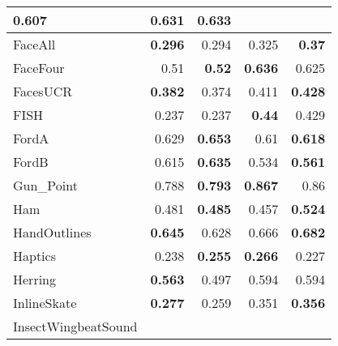\begin{longtable}{|l||r|r||r|r|}
\cellcolor[rgb]{ .973,  .796,  .678} \textbf{0.607} &
0.631 &
\cellcolor[rgb]{ .973,  .796,  .678} \textbf{0.633}
\bigstrut\\
\hline
\rowcolor[rgb]{ .851,  .851,  .851} FaceAll &
\cellcolor[rgb]{ .973,  .796,  .678} \textbf{0.296} &
0.294 &
0.325 &
\cellcolor[rgb]{ .973,  .796,  .678} \textbf{0.37}
\bigstrut\\
\hline
FaceFour &
0.51 &
\cellcolor[rgb]{ .973,  .796,  .678} \textbf{0.52} &
\cellcolor[rgb]{ .973,  .796,  .678} \textbf{0.636} &
0.625
\bigstrut\\
\hline
\rowcolor[rgb]{ .851,  .851,  .851} FacesUCR &
\cellcolor[rgb]{ .973,  .796,  .678} \textbf{0.382} &
0.374 &
0.411 &
\cellcolor[rgb]{ .973,  .796,  .678} \textbf{0.428}
\bigstrut\\
\hline
FISH &
0.237 &
0.237 &
\cellcolor[rgb]{ .973,  .796,  .678} \textbf{0.44} &
0.429
\bigstrut\\
\hline
\rowcolor[rgb]{ .851,  .851,  .851} FordA &
0.629 &
\cellcolor[rgb]{ .973,  .796,  .678} \textbf{0.653} &
0.61 &
\cellcolor[rgb]{ .973,  .796,  .678} \textbf{0.618}
\bigstrut\\
\hline
FordB &
0.615 &
\cellcolor[rgb]{ .973,  .796,  .678} \textbf{0.635} &
0.534 &
\cellcolor[rgb]{ .973,  .796,  .678} \textbf{0.561}
\bigstrut\\
\hline
\rowcolor[rgb]{ .851,  .851,  .851} Gun\_Point &
0.788 &
\cellcolor[rgb]{ .973,  .796,  .678} \textbf{0.793} &
\cellcolor[rgb]{ .973,  .796,  .678} \textbf{0.867} &
0.86
\bigstrut\\
\hline
Ham &
0.481 &
\cellcolor[rgb]{ .973,  .796,  .678} \textbf{0.485} &
0.457 &
\cellcolor[rgb]{ .973,  .796,  .678} \textbf{0.524}
\bigstrut\\
\hline
\rowcolor[rgb]{ .851,  .851,  .851} HandOutlines &
\cellcolor[rgb]{ .973,  .796,  .678} \textbf{0.645} &
0.628 &
0.666 &
\cellcolor[rgb]{ .973,  .796,  .678} \textbf{0.682}
\bigstrut\\
\hline
Haptics &
0.238 &
\cellcolor[rgb]{ .973,  .796,  .678} \textbf{0.255} &
\cellcolor[rgb]{ .973,  .796,  .678} \textbf{0.266} &
0.227
\bigstrut\\
\hline
\rowcolor[rgb]{ .851,  .851,  .851} Herring &
\cellcolor[rgb]{ .973,  .796,  .678} \textbf{0.563} &
0.497 &
0.594 &
0.594
\bigstrut\\
\hline
InlineSkate &
\cellcolor[rgb]{ .973,  .796,  .678} \textbf{0.277} &
0.259 &
0.351 &
\cellcolor[rgb]{ .973,  .796,  .678} \textbf{0.356}
\bigstrut\\
\hline
\rowcolor[rgb]{ .851,  .851,  .851} InsectWingbeatSound &

\end{longtable}
